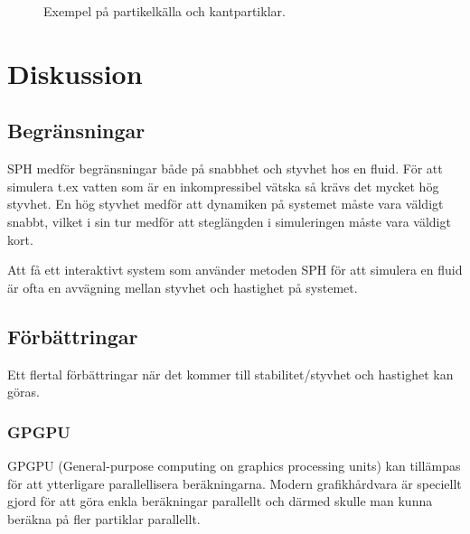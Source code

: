 \documentclass[a4paper,12pt,oneside,final]{extarticle}
\begin{document}
\begin{figure}[H]
  \centering
    \setlength\fboxsep{0pt}
    \setlength\fboxrule{0.5pt}
  \caption{Exempel på partikelkälla och kantpartiklar.}
\end{figure}

\clearpage

\section{Diskussion}
\subsection{Begränsningar}
SPH medför begränsningar både på snabbhet och styvhet hos en fluid.
För att simulera t.ex vatten som är en inkompressibel vätska så krävs det mycket hög styvhet.
En hög styvhet medför att dynamiken på systemet måste vara väldigt snabbt, vilket i sin tur medför att steglängden i simuleringen måste vara väldigt kort.

Att få ett interaktivt system som använder metoden SPH för att simulera en fluid är ofta en avvägning mellan styvhet och hastighet på systemet. 
\subsection{Förbättringar}
Ett flertal förbättringar när det kommer till stabilitet/styvhet och hastighet kan göras.
\subsubsection{GPGPU}
GPGPU (General-purpose computing on graphics processing units) kan tillämpas för att ytterligare parallellisera beräkningarna.
Modern grafikhårdvara är speciellt gjord för att göra enkla beräkningar parallellt och därmed skulle man kunna beräkna på fler partiklar parallellt.
\end{document}

